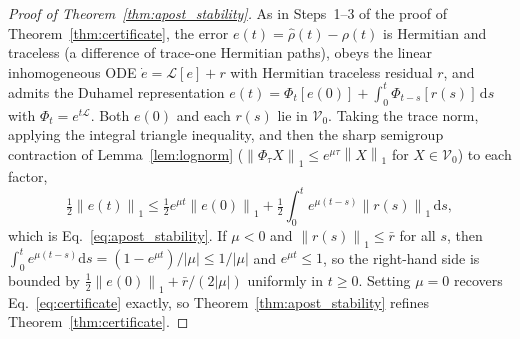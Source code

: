 \documentclass[twocolumn,aps,prxquantum,superscriptaddress,nofootinbib,floatfix,longbibliography]{revtex4-2}
\newcommand{\calL}{\mathcal{L}}
\newcommand{\dd}{\mathrm{d}}
\newcommand{\norm}[1]{\left\lVert #1 \right\rVert}
\newcommand{\abs}[1]{\left\lvert #1 \right\rvert}
\newcommand{\rhohat}{\widehat{\rho}}
\begin{document}
\begin{proof}[Proof of Theorem~\ref{thm:apost_stability}]
As in Steps~1--3 of the proof of Theorem~\ref{thm:certificate}, the error $e(t)=\rhohat(t)-\rho(t)$ is Hermitian and traceless (a difference of trace-one Hermitian paths), obeys the linear inhomogeneous ODE $\dot e=\calL[e]+r$ with Hermitian traceless residual $r$, and admits the Duhamel representation $e(t)=\Phi_t[e(0)]+\int_0^t\Phi_{t-s}[r(s)]\,\dd s$ with $\Phi_t=e^{t\calL}$. Both $e(0)$ and each $r(s)$ lie in $\mathcal{V}_0$. Taking the trace norm, applying the integral triangle inequality, and then the sharp semigroup contraction of Lemma~\ref{lem:lognorm} ($\norm{\Phi_\tau X}_1\le e^{\mu\tau}\norm{X}_1$ for $X\in\mathcal{V}_0$) to each factor,
\[
\tfrac12\norm{e(t)}_1\le\tfrac12 e^{\mu t}\norm{e(0)}_1+\tfrac12\int_0^t e^{\mu(t-s)}\norm{r(s)}_1\,\dd s,
\]
which is Eq.~\eqref{eq:apost_stability}. If $\mu<0$ and $\norm{r(s)}_1\le\bar r$ for all $s$, then $\int_0^t e^{\mu(t-s)}\dd s=(1-e^{\mu t})/\abs{\mu}\le1/\abs{\mu}$ and $e^{\mu t}\le1$, so the right-hand side is bounded by $\tfrac12\norm{e(0)}_1+\bar r/(2\abs{\mu})$ uniformly in $t\ge0$. Setting $\mu=0$ recovers Eq.~\eqref{eq:certificate} exactly, so Theorem~\ref{thm:apost_stability} refines Theorem~\ref{thm:certificate}.
\end{proof}
\end{document}
